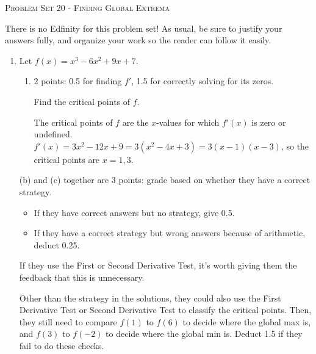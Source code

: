 \documentclass{article}
\begin{document}
\begin{center}
  \large\textsc{Problem Set 20 - Finding Global Extrema}
\end{center}

There is no Edfinity for this problem set! As usual, be sure to justify your answers fully, and organize your work so the reader can follow it easily. 

\begin{enumerate}
\item Let $f(x) = x^3 - 6x^2 + 9x + 7$.

  \begin{enumerate}

  \item

    \begin{grading}
      2 points: 0.5 for finding $f'$, 1.5 for correctly solving for its zeros. 
    \end{grading}

    \begin{problem}[\vfill]
      Find the critical points of $f$. 
    \end{problem}

    \begin{solution}  %
      The critical points of $f$ are the $x$-values for which $f'(x)$ is
      zero or undefined.
      $f'(x) = 3x^2 - 12x + 9 = 3(x^2 - 4x + 3) = 3(x - 1)(x - 3)$, so the critical points are $\boxed{x = 1, 3}$. 
    \end{solution}

  \end{enumerate}

  \begin{grading}
    (b) and (c) together are 3 points: grade based on whether they have a correct strategy.
    \begin{itemize}[nosep]
    \item If they have correct answers but no strategy, give 0.5. 
    \item If they have a correct strategy but wrong answers because of arithmetic, deduct 0.25. 
    \end{itemize}
    If they use the First or Second Derivative Test, it's worth giving them the feedback that this is unnecessary.

    Other than the strategy in the solutions, they could also use the First Derivative Test or Second Derivative Test to classify the critical points. Then, they still need to compare $f(1)$ to $f(6)$ to decide where the global max is, and $f(3)$ to $f(-2)$ to decide where the global min is. Deduct 1.5 if they fail to do these checks. 
  \end{grading}


\end{enumerate}
\end{document}
